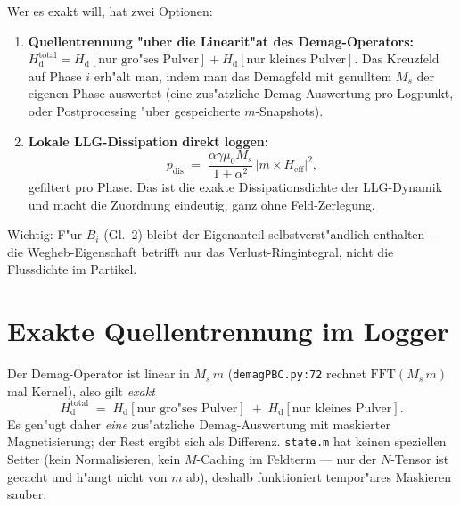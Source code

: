 \documentclass[11pt,a4paper]{article}
\begin{document}
Wer es exakt will, hat zwei Optionen:
\begin{enumerate}
  \item \textbf{Quellentrennung "uber die Linearit"at des Demag-Operators:} $H_\mathrm{d}^\text{total} = H_\mathrm{d}[\text{nur gro"ses Pulver}] + H_\mathrm{d}[\text{nur kleines Pulver}]$. Das Kreuzfeld auf Phase $i$ erh"alt man, indem man das Demagfeld mit genulltem $M_s$ der eigenen Phase auswertet (eine zus"atzliche Demag-Auswertung pro Logpunkt, oder Postprocessing "uber gespeicherte $m$-Snapshots).
  \item \textbf{Lokale LLG-Dissipation direkt loggen:}
  \begin{equation}
  p_\text{dis} \;=\; \frac{\alpha \gamma \mu_0 M_s}{1+\alpha^2}\, \left| m \times H_\text{eff} \right|^2 ,
  \end{equation}
  gefiltert pro Phase. Das ist die exakte Dissipationsdichte der LLG-Dynamik und macht die Zuordnung eindeutig, ganz ohne Feld-Zerlegung.
\end{enumerate}

Wichtig: F"ur $B_i$ (Gl.~2) bleibt der Eigenanteil selbstverst"andlich enthalten --- die Wegheb-Eigenschaft betrifft nur das Verlust-Ringintegral, nicht die Flussdichte im Partikel.

\section{Exakte Quellentrennung im Logger}

Der Demag-Operator ist linear in $M_s\,m$ (\texttt{demagPBC.py:72} rechnet $\mathrm{FFT}(M_s\, m)$ mal Kernel), also gilt \emph{exakt}
\begin{equation}
H_\mathrm{d}^\text{total} \;=\; H_\mathrm{d}[\text{nur gro"ses Pulver}] \;+\; H_\mathrm{d}[\text{nur kleines Pulver}] .
\end{equation}
Es gen"ugt daher \emph{eine} zus"atzliche Demag-Auswertung mit maskierter Magnetisierung; der Rest ergibt sich als Differenz. \texttt{state.m} hat keinen speziellen Setter (kein Normalisieren, kein $M$-Caching im Feldterm --- nur der $N$-Tensor ist gecacht und h"angt nicht von $m$ ab), deshalb funktioniert tempor"ares Maskieren sauber:
\end{document}
